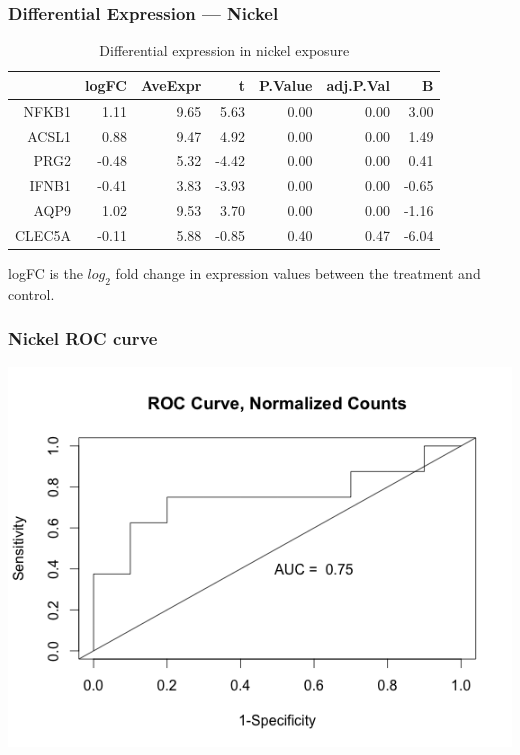 \documentclass{beamer}
\begin{document}
\begin{frame}[fragile]
  	\frametitle{Differential Expression --- Nickel}
 		\begin{table}[ht]
		\caption {Differential expression in nickel exposure} \label{tab:nickel} 
		\centering
		\begin{tabular}{rrrrrrr}
 			\hline
 			& logFC & AveExpr & t & P.Value & adj.P.Val & B \\ 
  			\hline
			NFKB1 & 1.11 & 9.65 & 5.63 & 0.00 & 0.00 & 3.00 \\ 
  			ACSL1 & 0.88 & 9.47 & 4.92 & 0.00 & 0.00 & 1.49 \\ 
  			PRG2 & -0.48 & 5.32 & -4.42 & 0.00 & 0.00 & 0.41 \\ 
  			IFNB1 & -0.41 & 3.83 & -3.93 & 0.00 & 0.00 & -0.65 \\ 
  			AQP9 & 1.02 & 9.53 & 3.70 & 0.00 & 0.00 & -1.16 \\ 
  			CLEC5A & -0.11 & 5.88 & -0.85 & 0.40 & 0.47 & -6.04 \\ 
  			 \hline
		\end{tabular}
		\end{table}
		\small logFC is the $log_{2}$ fold change in expression values between the treatment and control.
\end{frame}

\begin{frame}
	 \frametitle{Nickel ROC curve}
		\centering
	 	\includegraphics[scale=0.45]{../paper/figs/Nickel_ASCL1-APQ9.png} 
\end{frame}
\end{document}
